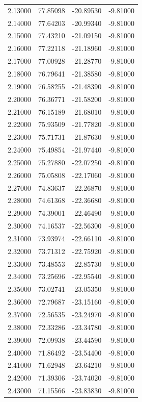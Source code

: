 \begin{table}
\begin{tabular}{llll}
2.13000 & 77.85098 & -20.89530 & -9.81000 \\
2.14000 & 77.64203 & -20.99340 & -9.81000 \\
2.15000 & 77.43210 & -21.09150 & -9.81000 \\
2.16000 & 77.22118 & -21.18960 & -9.81000 \\
2.17000 & 77.00928 & -21.28770 & -9.81000 \\
2.18000 & 76.79641 & -21.38580 & -9.81000 \\
2.19000 & 76.58255 & -21.48390 & -9.81000 \\
2.20000 & 76.36771 & -21.58200 & -9.81000 \\
2.21000 & 76.15189 & -21.68010 & -9.81000 \\
2.22000 & 75.93509 & -21.77820 & -9.81000 \\
2.23000 & 75.71731 & -21.87630 & -9.81000 \\
2.24000 & 75.49854 & -21.97440 & -9.81000 \\
2.25000 & 75.27880 & -22.07250 & -9.81000 \\
2.26000 & 75.05808 & -22.17060 & -9.81000 \\
2.27000 & 74.83637 & -22.26870 & -9.81000 \\
2.28000 & 74.61368 & -22.36680 & -9.81000 \\
2.29000 & 74.39001 & -22.46490 & -9.81000 \\
2.30000 & 74.16537 & -22.56300 & -9.81000 \\
2.31000 & 73.93974 & -22.66110 & -9.81000 \\
2.32000 & 73.71312 & -22.75920 & -9.81000 \\
2.33000 & 73.48553 & -22.85730 & -9.81000 \\
2.34000 & 73.25696 & -22.95540 & -9.81000 \\
2.35000 & 73.02741 & -23.05350 & -9.81000 \\
2.36000 & 72.79687 & -23.15160 & -9.81000 \\
2.37000 & 72.56535 & -23.24970 & -9.81000 \\
2.38000 & 72.33286 & -23.34780 & -9.81000 \\
2.39000 & 72.09938 & -23.44590 & -9.81000 \\
2.40000 & 71.86492 & -23.54400 & -9.81000 \\
2.41000 & 71.62948 & -23.64210 & -9.81000 \\
2.42000 & 71.39306 & -23.74020 & -9.81000 \\
2.43000 & 71.15566 & -23.83830 & -9.81000 \\

\end{tabular}
\end{table}
